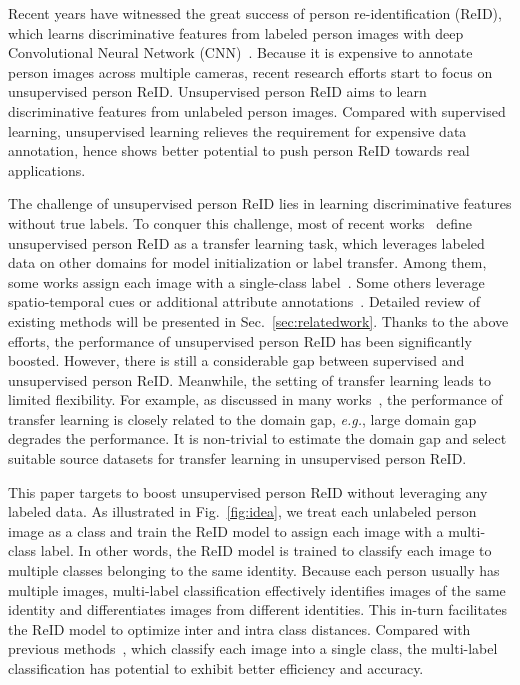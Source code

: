 \documentclass[10pt,twocolumn,letterpaper]{article}
\begin{document}
Recent years have witnessed the great success of person re-identification (ReID), which learns discriminative features from labeled person images with deep Convolutional Neural Network (CNN)~\cite{zheng2016person, krizhevsky2012imagenet, he2016deep,su2015multi,li2019pose,su2017pose,su2016deep,su2017attributes}. Because it is expensive to annotate person images across multiple cameras, recent research efforts start to focus on unsupervised person ReID. Unsupervised person ReID aims to learn discriminative features from unlabeled person images. Compared with supervised learning, unsupervised learning relieves the requirement for expensive data annotation, hence shows better potential to push person ReID towards real applications.




The challenge of unsupervised person ReID lies in learning discriminative features without true labels. To conquer this challenge, most of recent works~\cite{yu2017cross, zhong2019invariance, Lv_2018_CVPR, lin2018multi,wang2018transferable} define unsupervised person ReID as a transfer learning task, which leverages labeled data on other domains for model initialization or label transfer. Among them, some works assign each image with a single-class label~\cite{zhong2019invariance}. Some others leverage spatio-temporal cues or additional attribute annotations~\cite{Lv_2018_CVPR,lin2018multi,wang2018transferable}. Detailed review of existing methods will be presented in Sec.~\ref{sec:relatedwork}. Thanks to the above efforts, the performance of unsupervised person ReID has been significantly boosted. However, there is still a considerable gap between supervised and unsupervised person ReID. Meanwhile, the setting of transfer learning leads to limited flexibility. For example, as discussed in many works~\cite{long2015learning,Yan_2017_CVPR,wei2018person}, the performance of transfer learning is closely related to the domain gap, \emph{e.g.}, large domain gap degrades the performance. It is non-trivial to estimate the domain gap and select suitable source datasets for transfer learning in unsupervised person ReID.

This paper targets to boost unsupervised person ReID without leveraging any labeled data. As illustrated in Fig.~\ref{fig:idea}, we treat each unlabeled person image as a class and train the ReID model to assign each image with a multi-class label. In other words, the ReID model is trained to classify each image to multiple classes belonging to the same identity. Because each person usually has multiple images, multi-label classification effectively identifies images of the same identity and differentiates images from different identities. This in-turn facilitates the ReID model to optimize inter and intra class distances. Compared with previous methods~\cite{lin2019bottom,wu2018unsupervised}, which classify each image into a single class, the multi-label classification has potential to exhibit better efficiency and accuracy.
\end{document}

